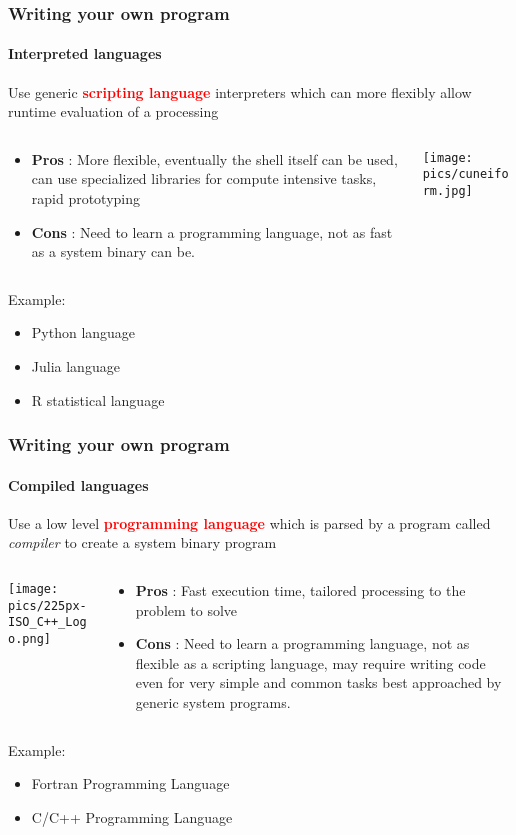 \documentclass[unknownkeysallowed, 10pt, a4 paper, handout]{beamer}
\newcommand{\focus}[1]{\textbf{\textcolor{red}{#1}}}
\begin{document}
\begin{frame}[label=scripting]
  \frametitle{Writing your own program}
  \framesubtitle{Interpreted languages}
  Use generic \focus{scripting language} interpreters which
  can more flexibly allow runtime evaluation of a processing
  \begin{columns}[T]
    \begin{column}{.66\textwidth}
      \begin{itemize}
        \item \textbf{Pros} : More flexible, eventually the shell itself can be
          used, can use specialized libraries for compute intensive tasks,
          rapid prototyping
        \item \textbf{Cons} : Need to learn a programming language, not as
          fast as a system binary can be.
      \end{itemize}
    \end{column}
    \hfill
    \begin{column}{.33\textwidth}
      \vspace{10pt}
      \texttt{[image: pics/cuneiform.jpg]}
    \end{column}
  \end{columns}
  Example:
  \begin{itemize}
    \item Python language
    \item Julia language
    \item R statistical language
  \end{itemize}
\end{frame}


\begin{frame}[label=compiled]
  \frametitle{Writing your own program}
  \framesubtitle{Compiled languages}
  Use a low level \focus{programming language} which is parsed by a program
  called \textit{compiler} to create a system binary program
  \begin{columns}[T]
    \begin{column}{.23\textwidth}
      \texttt{[image: pics/225px-ISO\_C++\_Logo.png]}
    \end{column}
    \hfill
    \begin{column}{.76\textwidth}
      \begin{itemize}
        \item \textbf{Pros} : Fast execution time, tailored processing to the
          problem to solve
        \item \textbf{Cons} : Need to learn a programming language, not as
          flexible as a scripting language, may require writing code even
          for very simple and common tasks best approached by generic 
          system programs.
      \end{itemize}
    \end{column}
  \end{columns}
  Example:
  \begin{itemize}
    \item Fortran Programming Language
    \item C/C++ Programming Language
  \end{itemize}
\end{frame}
\end{document}
